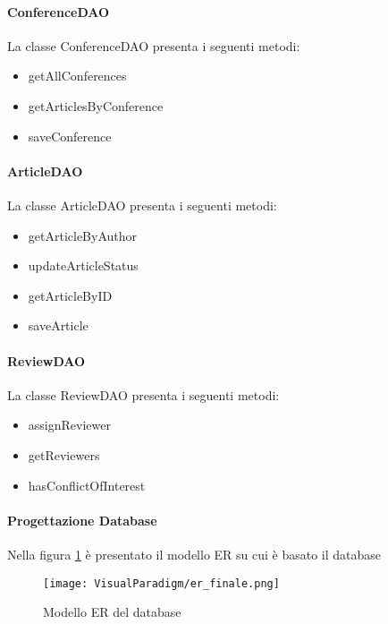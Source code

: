 \paragraph{ConferenceDAO}
La classe ConferenceDAO presenta i seguenti metodi:
\begin{itemize}
\item getAllConferences
\item getArticlesByConference
\item saveConference
\end{itemize}

\paragraph{ArticleDAO}
La classe ArticleDAO presenta i seguenti metodi:
\begin{itemize}
\item getArticleByAuthor
\item updateArticleStatus
\item getArticleByID
\item saveArticle
\end{itemize}

\paragraph{ReviewDAO}
La classe ReviewDAO presenta i seguenti metodi:
\begin{itemize}
\item assignReviewer
\item getReviewers
\item hasConflictOfInterest
\end{itemize}

\paragraph{Progettazione Database}
Nella figura \ref{fig:modello_er} è presentato il modello ER su cui è basato il
database
\begin{figure}[!ht]
  \centering
  \texttt{[image: VisualParadigm/er\_finale.png]}
  \caption{Modello ER del database}
  \label{fig:modello_er}
\end{figure}

